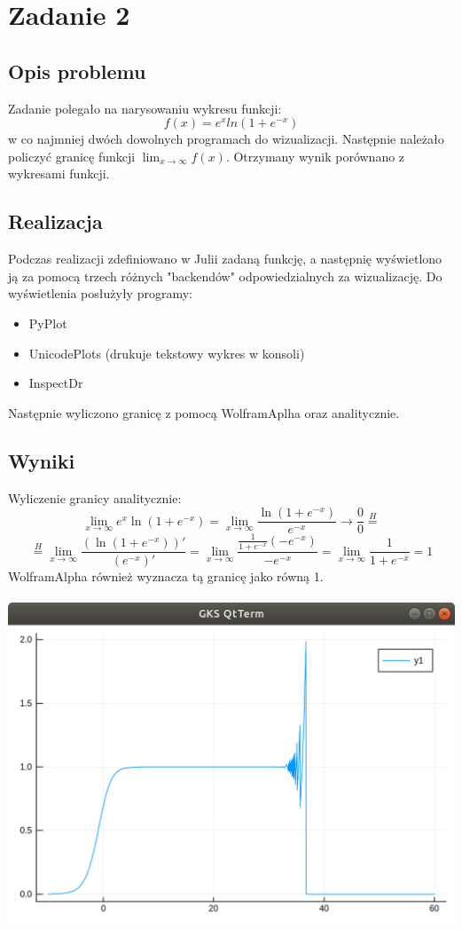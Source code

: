 \documentclass[]{article}
\begin{document}
\section{Zadanie 2}
\subsection{Opis problemu}
Zadanie polegało na narysowaniu wykresu funkcji: \[f(x)=e^xln(1 + e^{-x}
)\]
w co najmniej dwóch dowolnych programach do wizualizacji. Następnie należało policzyć granicę funkcji $\lim_{x\to\infty}f(x)$. Otrzymany wynik porównano z wykresami funkcji.
\subsection{Realizacja}
Podczas realizacji zdefiniowano w Julii zadaną funkcję, a następnię wyświetlono ją za pomocą trzech różnych "backendów" odpowiedzialnych za wizualizację. Do wyświetlenia posłużyły programy:
\begin{itemize}
	\item PyPlot
	\item UnicodePlots (drukuje tekstowy wykres w konsoli)
	\item InspectDr
\end{itemize}
Następnie wyliczono granicę z pomocą WolframAplha oraz analitycznie.

\subsection{Wyniki}
Wyliczenie granicy analitycznie:
\[\lim_{x\to\infty} e^x \ln(1 + e^{-x}) = \lim_{x\to\infty} \frac{\ln(1+e^{-x})}{e^{-x}} \rightarrow \frac{0}{0} \stackrel{H}{=}\]
\[\stackrel{H}{=} \lim_{x\to\infty} \frac{(\ln(1+e^{-x}))'}{(e^{-x})'} = \lim_{x\to\infty} \frac{\frac{1}{1+e^{-x}}(-e^{-x})}{-e^{-x}}= \lim_{x\to\infty} \frac{1}{1+e^{-x}} = 1\]
WolframAlpha również wyznacza tą granicę jako równą 1. 
\\\\
\includegraphics[scale=0.25]{PyPlotZad2.png}
\end{document}
